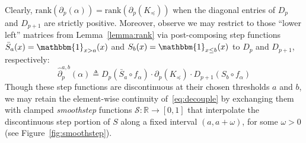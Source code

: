 \documentclass[10pt]{article}
\numberwithin{equation}{section}
\newcommand{\+}{%
	\raisebox{0.18ex}{\scaleobj{0.55}{+}}
}
\theoremstyle{definition}
\theoremstyle{definition}
\begin{document}
Clearly, $\mathrm{rank}(\partial_p(\alpha)) = \mathrm{rank}(\partial_p(K_\preceq))$ when the diagonal entries of $D_p$ and $D_{p+1}$ are strictly positive. Moreover, observe we may restrict to those ``lower left'' matrices from Lemma~\ref{lemma:rank} via post-composing step functions $\bar{S}_a(x) = \mathbbm{1}_{x > a}(x)$ and $S_b(x) = \mathbbm{1}_{x \leq b}(x)$ to $D_p$ and $D_{p+1}$, respectively:
\begin{equation}\label{eq:rank_equiv_param}
	 \hat{\partial}_p^{a,b}(\alpha) \triangleq D_p(\bar{S}_a \circ f_\alpha) \cdot \partial_p(K_\preceq) \cdot D_{p+1}(S_b \circ f_\alpha) 
	\end{equation}
Though these step functions are discontinuous at their chosen thresholds $a$ and $b$, we may retain the element-wise continuity of~\eqref{eq:decouple} by exchanging them with clamped \emph{smoothstep} functions $\mathcal{S}: \mathbb{R} \to [0, 1]$ that interpolate the discontinuous step portion of $S$ along a fixed interval $(a,a+\omega)$, for some $\omega > 0$ (see Figure~\ref{fig:smoothstep}).
\end{document}
